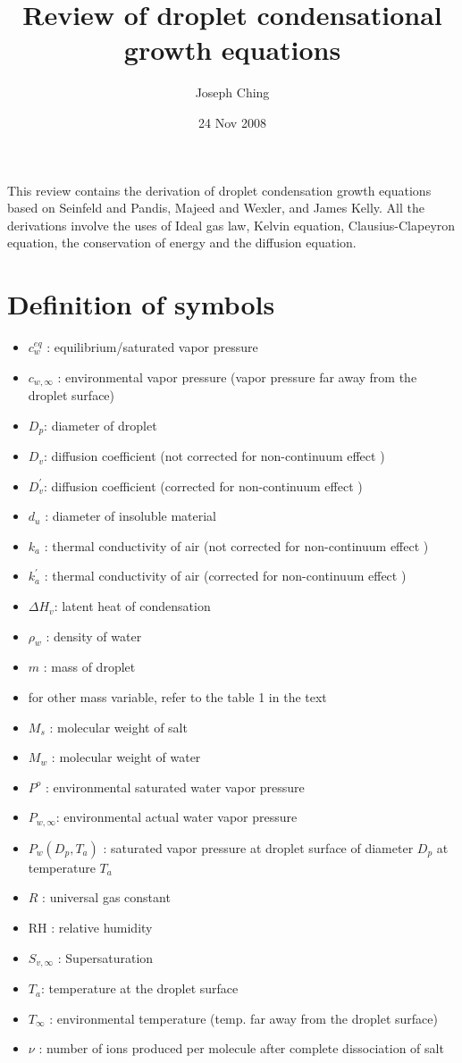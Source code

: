 \documentclass[12pt]{amsart}
\title{Review of droplet condensational growth equations}
\author{Joseph Ching}
\date{24 Nov 2008} %
\begin{document}
\maketitle
\tableofcontents

This review contains the derivation of droplet condensation growth equations based on Seinfeld and Pandis, Majeed and Wexler, and James Kelly. All the derivations involve the uses of Ideal gas law, Kelvin equation, Clausius-Clapeyron equation, the conservation of energy and the diffusion equation.

\section{Definition of symbols}

\begin{itemize}
\item $c_{w}^{eq}$ : equilibrium/saturated vapor pressure
\item $c_{w, \infty}$ : environmental vapor pressure (vapor pressure far away from the droplet surface)
\item $D_{p}$: diameter of droplet 
\item $D_{v}$: diffusion coefficient (not corrected for non-continuum effect )
\item $D_{v}^{'}$: diffusion coefficient (corrected for non-continuum effect )
\item $d_u$ : diameter of insoluble material
\item $k_{a}$ : thermal conductivity of air (not corrected for non-continuum effect )
\item $k_{a}^{'}$ : thermal conductivity of air (corrected for non-continuum effect )
\item $\Delta H_{v}$: latent heat of condensation
\item $\rho_{w}$ : density of water
\item $m$ : mass of droplet
\item for other mass variable, refer to the table 1 in the text
\item $M_{s}$ : molecular weight of salt
\item $M_{w}$ : molecular weight of water
\item $P^{o}$ : environmental saturated water vapor pressure 
\item $P_{w,\infty} $: environmental actual water vapor pressure
\item $P_{w}(D_{p}, T_{a}) $ : saturated vapor pressure at droplet surface of diameter $ D_{p}$ at temperature $T_{a}$  
\item $R$ : universal gas constant
\item $\textrm{RH}$ : relative humidity
\item $S_{v, \infty}$ : Supersaturation  
\item $T_{a}$: temperature at the droplet surface
\item $T_{\infty}$ : environmental temperature (temp. far away from the droplet surface)
\item $\nu$ : number of ions produced per molecule after complete dissociation of salt 
\end{itemize}
\end{document}

